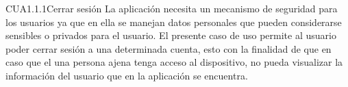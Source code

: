 
\begin{UseCase}{CUA1.1.1}{Cerrar sesión}
    {
	La aplicación necesita un mecanismo de seguridad para los usuarios ya que en ella se manejan datos personales que pueden considerarse sensibles o privados para el usuario. El presente caso de uso permite al usuario poder cerrar sesión a una determinada cuenta, esto con la finalidad de que en caso que el una persona ajena tenga acceso al dispositivo, no pueda visualizar la información del usuario que en la aplicación se encuentra. 
    }

\end{UseCase}
